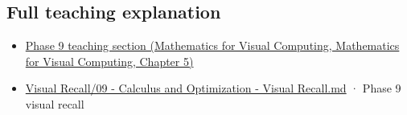 \subsection{Full teaching explanation}\label{appendix-ab31ef447dbf-full-teaching-explanation}

\begin{itemize}
\tightlist
\item
  \href{../02-Mathematics-for-Visual-Computing/main.pdf\#nameddest=02-foundations-ii-ch021-jacobians-curvature-and-local-approximation}{Phase 9 teaching section (Mathematics for Visual Computing, Mathematics for Visual Computing, Chapter 5)}
\item
  \hyperref[appendix-adf48f5dc5c1]{Visual Recall/09 - Calculus and Optimization - Visual Recall.md} · Phase 9 visual recall
\end{itemize}
